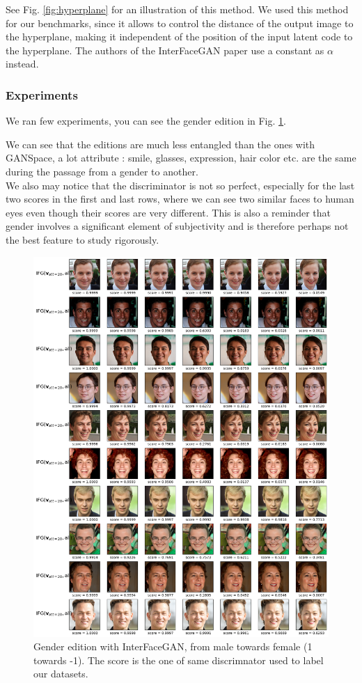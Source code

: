 \documentclass[a4paper]{article}
\begin{document}
See Fig. \ref{fig:hyperplane} for an illustration of this method. We used this method for our benchmarks, since it allows to control the distance of the output image to the hyperplane, making it independent of the position of the input latent code to the hyperplane. The authors of the InterFaceGAN paper \cite{shen2020interfacegan} use a constant as $\alpha$ instead.

\subsubsection{Experiments}

We ran few experiments, you can see the gender edition in Fig. \ref{ifganexp}.

We can see that the editions are much less entangled than the ones with GANSpace, a lot attribute : smile, glasses, expression, hair color etc. are the same during the passage from a gender to another. \\ We also may notice that the discriminator is not so perfect, especially for the last two scores in the first and last rows, where we can see two similar faces to human eyes even though their scores are very different. This is also a reminder that gender involves a significant element of subjectivity and is therefore perhaps not the best feature to study rigorously.

\begin{figure}[hbt!]
    \centering
    \includegraphics[width=\hsize]{fig/IFGANgenderwscore.png}
    \caption{Gender edition with InterFaceGAN, from male towards female (1 towards -1). The score is the one of same discrimnator used to label our datasets.}
    \label{ifganexp}
\end{figure}
\end{document}
